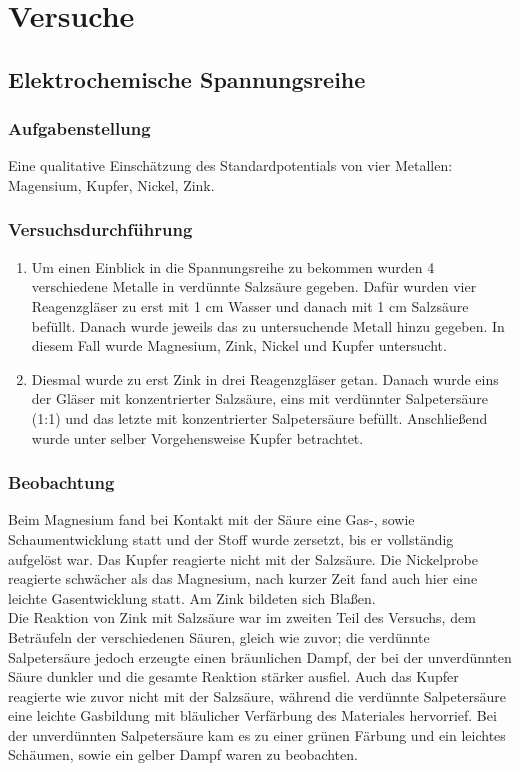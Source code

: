 \documentclass{scrartcl}
\begin{document}
\section{Versuche}
\subsection{Elektrochemische Spannungsreihe}
\subsubsection{Aufgabenstellung}
Eine qualitative Einschätzung des Standardpotentials von vier Metallen: Magensium, Kupfer, Nickel, Zink.
\subsubsection{Versuchsdurchführung}
\begin{enumerate}[label=\alph*)]
	\item Um einen Einblick in die Spannungsreihe zu bekommen wurden 4 verschiedene Metalle in verdünnte Salzsäure gegeben. Dafür wurden vier Reagenzgläser zu erst mit 1 cm Wasser und danach mit 1 cm Salzsäure befüllt. Danach wurde jeweils das zu untersuchende Metall hinzu gegeben. In diesem Fall wurde Magnesium, Zink, Nickel und Kupfer untersucht.
	\item Diesmal wurde zu erst Zink in drei Reagenzgläser getan. Danach wurde eins der Gläser mit konzentrierter Salzsäure, eins mit verdünnter Salpetersäure (1:1) und das letzte mit konzentrierter Salpetersäure befüllt. Anschließend wurde unter selber Vorgehensweise Kupfer betrachtet.
\end{enumerate}
\subsubsection{Beobachtung}
Beim Magnesium fand bei Kontakt mit der Säure eine Gas-, sowie Schaumentwicklung statt und der Stoff wurde zersetzt, bis er vollständig aufgelöst war. 
Das Kupfer reagierte nicht mit der Salzsäure. Die Nickelprobe reagierte schwächer als das Magnesium, nach kurzer Zeit fand auch hier eine leichte Gasentwicklung statt. Am Zink bildeten sich Blaßen. \\
Die Reaktion von Zink mit Salzsäure war im zweiten Teil des Versuchs, dem Beträufeln der verschiedenen Säuren, gleich wie zuvor; die verdünnte Salpetersäure jedoch erzeugte einen bräunlichen Dampf, der bei der unverdünnten Säure dunkler und die gesamte Reaktion stärker ausfiel. Auch das Kupfer reagierte wie zuvor nicht mit der Salzsäure, während die verdünnte Salpetersäure eine leichte Gasbildung mit bläulicher Verfärbung des Materiales hervorrief. Bei der unverdünnten Salpetersäure kam es zu einer grünen Färbung und ein leichtes Schäumen, sowie ein gelber Dampf waren zu beobachten.
\end{document}
